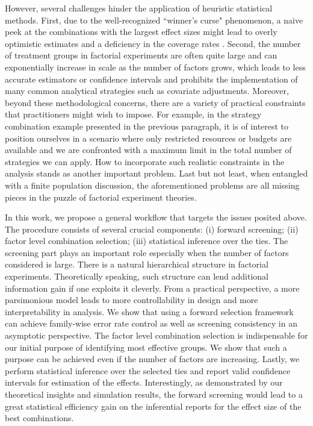 \documentclass[12pt]{article}
\begin{document}
However, several challenges hinder the application of heuristic statistical methods. First, due to the well-recognized ``winner's curse" phenomenon, a naive peek at the combinations with the largest effect sizes might lead to overly optimistic estimates and a deficiency in the coverage rates \citep{lee2018winner, andrews2019inference}. Second, the number of treatment groups in factorial experiments are often quite large and can exponentially increase in scale as the number of factors grows, which leads to less accurate estimators or confidence intervals and prohibits the implementation of many common analytical strategies such as covariate adjustments. Moreover, beyond these methodological concerns, there are a variety of practical constraints that practitioners might wish to impose. For example, in the strategy combination example presented in the previous paragraph, it is of interest to position ourselves in a scenario where only restricted resources or budgets are available and we are confronted with a maximum limit in the total number of strategies we can apply. How to incorporate such realistic constraints in the analysis stands as another important problem. Last but not least, when entangled with a finite population discussion, the aforementioned problems are all missing pieces in the puzzle of factorial experiment theories. 

In this work, we propose a general workflow that targets the issues posited above. The procedure consists of several crucial components: (i) forward  screening; (ii) factor level combination selection; (iii) statistical inference over the ties. The  screening part plays an important role especially when the number of factors considered is large. There is a natural hierarchical structure in factorial experiments. Theoretically speaking, such structure can lend additional information gain if one exploits it cleverly. From a practical perspective, a more parsimonious model leads to more controllability in design and more interpretability in analysis. We show that using a forward selection framework can achieve family-wise error rate control as well as  screening consistency in an asymptotic perspective. The factor level combination selection is indispensable for our initial purpose of identifying most effective groups. We show that such a purpose can be achieved even if the number of factors are increasing. Lastly, we perform statistical inference over the selected ties and report valid confidence intervals for estimation of the effects. Interestingly, as demonstrated by our theoretical insights and simulation results, the forward  screening would lead to a great statistical efficiency gain on the inferential reports for the effect size of the best combinations.
\end{document}
